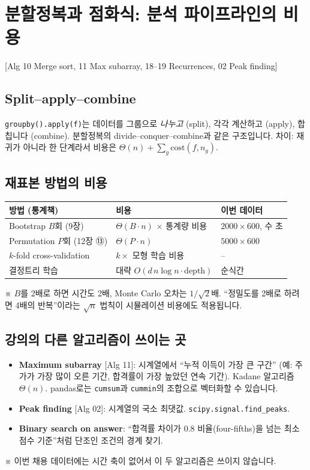 \documentclass[11pt,a4paper]{article}
\newcommand{\code}[1]{\texttt{#1}}
\newcommand{\aref}[1]{{\footnotesize\textsf{\color{blue!55!black}[Alg #1]}}}
\newcommand{\aside}[1]{{\footnotesize\color{black!65}#1}}
\begin{document}
\section{분할정복과 점화식: 분석 파이프라인의 비용}
\aref{10 Merge sort, 11 Max subarray, 18–19 Recurrences, 02 Peak finding}

\subsection{Split–apply–combine}
\code{groupby().apply(f)}는 데이터를 그룹으로 \emph{나누고} (split), 각각 계산하고 (apply), 합칩니다 (combine). 분할정복의 divide–conquer–combine과 같은 구조입니다. 차이: 재귀가 아니라 한 단계라서 비용은 $\Theta(n)+\sum_g \text{cost}(f, n_g)$.

\subsection{재표본 방법의 비용}
\begin{center}
\begin{tabular}{@{}l l l@{}}
\toprule
방법 (통계책) & 비용 & 이번 데이터 \\
\midrule
Bootstrap $B$회 (9장) & $\Theta(B\cdot n)$ $\times$ 통계량 비용 & $2000\times600$, 수 초 \\
Permutation $P$회 (12장 ⑬) & $\Theta(P\cdot n)$ & $5000\times600$ \\
$k$-fold cross-validation & $k\times$ 모형 학습 비용 & -- \\
결정트리 학습 & 대략 $O(d\,n\log n\cdot\text{depth})$ & 순식간 \\
\bottomrule
\end{tabular}
\end{center}
\aside{※ $B$를 2배로 하면 시간도 2배, Monte Carlo 오차는 $1/\sqrt2$배. ``정밀도를 2배로 하려면 4배의 반복''이라는 $\sqrt{n}$ 법칙이 시뮬레이션 비용에도 적용됩니다.}

\subsection{강의의 다른 알고리즘이 쓰이는 곳}
\begin{itemize}
\item \textbf{Maximum subarray} \aref{11}: 시계열에서 ``누적 이득이 가장 큰 구간'' (예: 주가가 가장 많이 오른 기간, 합격률이 가장 높았던 연속 기간). Kadane 알고리즘 $\Theta(n)$. pandas로는 \code{cumsum}과 \code{cummin}의 조합으로 벡터화할 수 있습니다.
\item \textbf{Peak finding} \aref{02}: 시계열의 국소 최댓값. \code{scipy.signal.find\_peaks}.
\item \textbf{Binary search on answer}: ``합격률 차이가 0.8 비율(four-fifths)을 넘는 최소 점수 기준''처럼 단조인 조건의 경계 찾기.
\end{itemize}
\aside{※ 이번 채용 데이터에는 시간 축이 없어서 이 두 알고리즘은 쓰이지 않습니다.}
\end{document}
